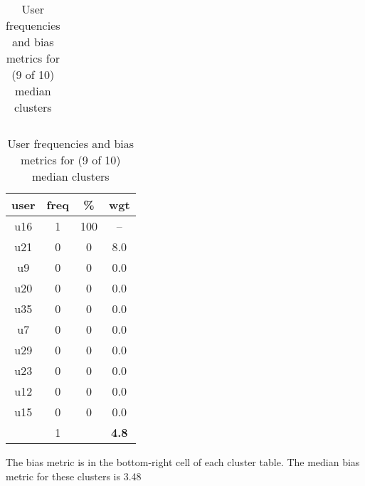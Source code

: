 \begin{table}
\begin{tabular}{ |c|c|c|c| }
\end{tabular}
\begin{tabular}{ |c|c|c|c| }
	\hline
	\textbf{user} & \textbf{freq} & \textbf{\%} & \textbf{wgt} \\
	\hline
	u16 & 1 & 100 & -- \\
	u21 & 0 & 0 & 8.0 \\
	u9 & 0 & 0 & 0.0 \\
	u20 & 0 & 0 & 0.0 \\
	u35 & 0 & 0 & 0.0 \\
	u7 & 0 & 0 & 0.0 \\
	u29 & 0 & 0 & 0.0 \\
	u23 & 0 & 0 & 0.0 \\
	u12 & 0 & 0 & 0.0 \\
	u15 & 0 & 0 & 0.0 \\
	 & 1 & & \textbf{4.8} \\
	\hline
\end{tabular}
\caption{User frequencies and bias metrics for (9 of 10) median clusters}
{\small The bias metric is in the bottom-right cell of each cluster table. The median bias metric for these clusters is 3.48}
\end{table}

